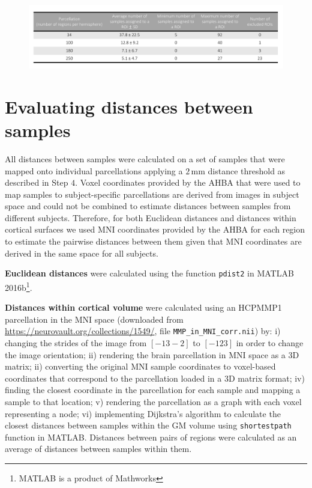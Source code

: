 \begin{figure}[h!]
  \centering
    \includegraphics[width=1\textwidth]{Chapter4/TableS4.pdf}
\label{TableS4}
\end{figure}

\section{Evaluating distances between samples}
\label{app:AppendixCh4_5}

All distances between samples were calculated on a set of samples that were mapped onto individual parcellations applying a $2\,$mm distance threshold as described in Step $4$. Voxel coordinates provided by the AHBA that were used to map samples to subject-specific parcellations are derived from images in subject space and could not be combined to estimate distances between samples from different subjects. Therefore, for both Euclidean distances and distances within cortical surfaces we used MNI coordinates provided by the AHBA for each region to estimate the pairwise distances between them given that MNI coordinates are derived in the same space for all subjects.

\textbf{Euclidean distances} were calculated using the function \texttt{pdist2} in MATLAB 2016b\footnote{MATLAB is a product of Mathworks}.

\textbf{Distances within cortical volume} were calculated using an HCPMMP1 \citep{Glasser2016} parcellation in the MNI space (downloaded from \url{https://neurovault.org/collections/1549/}, file \texttt{MMP\_in\_MNI\_corr.nii})  by: i) changing the strides of the image from $[-1 3 -2]$ to $[-1 2 3]$ in order to change the image orientation; ii) rendering the brain parcellation in MNI space as a 3D matrix; ii) converting the original MNI sample coordinates to voxel-based coordinates that correspond to the parcellation loaded in a 3D matrix format; iv) finding the closest coordinate in the parcellation for each sample and mapping a sample to that location; v) rendering the parcellation as a graph with each voxel representing a node; vi) implementing Dijkstra’s algorithm \citep{Dijkstra1959} to calculate the closest distances between samples within the GM volume using \texttt{shortestpath} function in MATLAB. Distances between pairs of regions were calculated as an average of distances between samples within them.

